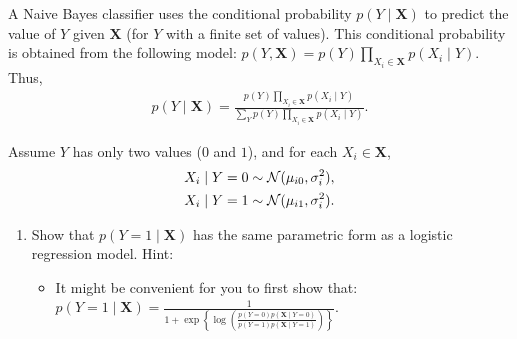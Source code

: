 \documentclass[11pt]{article}
\renewcommand{\vec}[1]{\mathbf{#1}}
\begin{document}
A Naive Bayes classifier uses the conditional probability $p(Y \mid \vec{X})$ to predict the value of $Y$ given $\vec{X}$ (for $Y$ with a finite set of values).
This conditional probability is obtained from the following model: $p(Y, \vec{X}) = p(Y) \prod_{X_i \in \vec{X}} p(X_i \mid Y)$.
Thus,
\begin{align*}
p(Y \mid \vec{X}) =
\frac{
p(Y) \prod_{X_i \in \vec{X}} p(X_i \mid Y)
}{
\sum_Y p(Y) \prod_{X_i \in \vec{X}} p(X_i \mid Y)
}.
\end{align*}

Assume $Y$ has only two values ($0$ and $1$), and for each $X_i \in \vec{X}$,
\begin{align*}
X_i \mid Y=0 &\sim {\cal N}(\mu_{i0}, \sigma_i^2),\\
X_i \mid Y=1 &\sim {\cal N}(\mu_{i1}, \sigma_i^2).
\end{align*}

\begin{enumerate}
\item Show that $p(Y = 1 \mid \vec{X})$ has the same parametric form as a logistic regression model.
Hint:
\begin{itemize}
\item It might be convenient for you to first show that:
$p(Y = 1 \mid \vec{X}) = \frac{1}{1 + \exp\left\{ \log \left( \frac{ p(Y=0) p(\vec{X} \mid Y=0) }{ p(Y=1) p(\vec{X} \mid Y=1) } \right) \right\}}$.
\end{itemize}

\begin{answertext}{10cm}{}
\end{answertext}
\end{enumerate}
\end{document}
